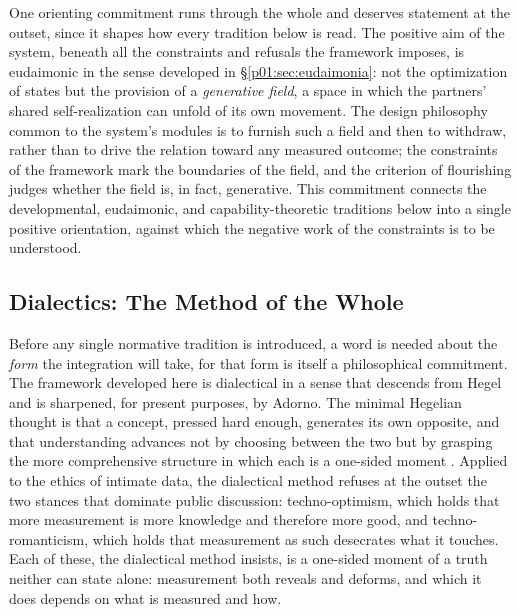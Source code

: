\documentclass[11pt,a4paper]{article}
\begin{document}
One orienting commitment runs through the whole and deserves statement at the outset, since it shapes how every tradition below is read. The positive aim of the system, beneath all the constraints and refusals the framework imposes, is eudaimonic in the sense developed in §\ref{p01:sec:eudaimonia}: not the optimization of states but the provision of a \emph{generative field}, a space in which the partners' shared self-realization can unfold of its own movement. The design philosophy common to the system's modules is to furnish such a field and then to withdraw, rather than to drive the relation toward any measured outcome; the constraints of the framework mark the boundaries of the field, and the criterion of flourishing judges whether the field is, in fact, generative. This commitment connects the developmental, eudaimonic, and capability-theoretic traditions below into a single positive orientation, against which the negative work of the constraints is to be understood.

\subsection{Dialectics: The Method of the Whole}\label{p01:sec:dialectics}

Before any single normative tradition is introduced, a word is needed about the \emph{form} the integration will take, for that form is itself a philosophical commitment. The framework developed here is dialectical in a sense that descends from Hegel and is sharpened, for present purposes, by Adorno. The minimal Hegelian thought is that a concept, pressed hard enough, generates its own opposite, and that understanding advances not by choosing between the two but by grasping the more comprehensive structure in which each is a one-sided moment \parencite{hegel1807phenomenology}. Applied to the ethics of intimate data, the dialectical method refuses at the outset the two stances that dominate public discussion: techno-optimism, which holds that more measurement is more knowledge and therefore more good, and techno-romanticism, which holds that measurement as such desecrates what it touches. Each of these, the dialectical method insists, is a one-sided moment of a truth neither can state alone: measurement both reveals and deforms, and which it does depends on what is measured and how.
\end{document}
